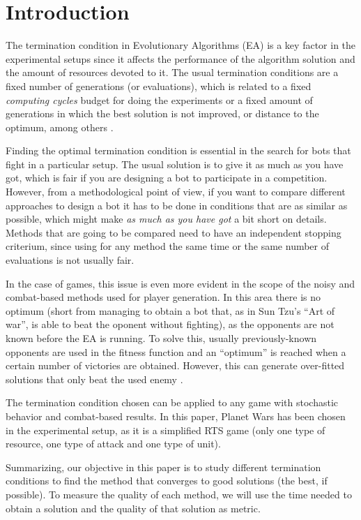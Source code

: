 \documentclass[runningheads,a4paper]{llncs}
\begin{document}
\section{Introduction}

The termination condition in Evolutionary Algorithms (EA) is a key
factor in the experimental setups since it affects the performance of
the algorithm solution and the amount of resources devoted to it. The
usual termination conditions are a fixed number of generations (or
evaluations), which is related to a fixed {\em computing cycles}
budget for doing the experiments or a fixed amount of generations in
which the best solution is not improved, or distance to the optimum,
among others \cite{RocheTermination13}.

Finding the optimal termination condition is essential in the search for
bots that fight in a particular setup. The usual solution is to give
it as much as you have got, which is fair if you are designing a bot %
to participate in a competition. However, from a methodological point
of view, if you want to compare different approaches to design a bot
it has to be done in conditions that are as similar as possible, which
might make {\em as much as you have got} a bit short on
details. Methods that are going to be compared need to have an
independent stopping criterium, since using for any method the same
time or the same number of evaluations is not usually fair. 
 
In the case of games, this issue is even more evident in the scope of
the noisy and combat-based methods used for player generation. In this
area there is no optimum (short from managing to obtain a bot that, as
in Sun Tzu's ``Art of war'', is able to beat the oponent without
fighting), as the opponents are not known before the EA is running. To
solve this, usually previously-known opponents are used in the fitness
function and an ``optimum'' is reached when a certain number of
victories are obtained. However, this can generate over-fitted
solutions that only beat the used enemy \cite{MoraNoisy12}. %


The termination condition chosen can be applied to any game with
stochastic behavior and combat-based results. In this paper, Planet
Wars has been chosen in the experimental setup, as it is a simplified
RTS game (only one type of resource, one type of attack and one type
of unit).

Summarizing, our objective in this paper is to study different 
termination conditions to find the method that converges to good 
solutions (the best, if possible). To measure the quality of each 
method, we will use the time needed to obtain a solution and the quality of that solution as metric.
\end{document}
